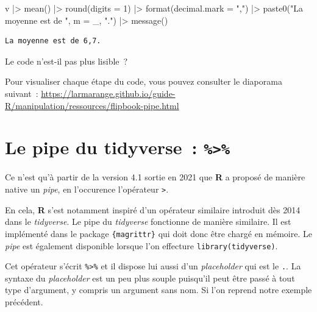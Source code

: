 \documentclass[
  letterpaper,
  DIV=11,
  numbers=noendperiod,
  oneside]{scrreprt}
\newenvironment{Shaded}{\begin{snugshade}}{\end{snugshade}}
\newcommand{\AttributeTok}[1]{\textcolor[rgb]{0.40,0.45,0.13}{#1}}
\newcommand{\DecValTok}[1]{\textcolor[rgb]{0.68,0.00,0.00}{#1}}
\newcommand{\FunctionTok}[1]{\textcolor[rgb]{0.28,0.35,0.67}{#1}}
\newcommand{\NormalTok}[1]{\textcolor[rgb]{0.00,0.23,0.31}{#1}}
\newcommand{\SpecialCharTok}[1]{\textcolor[rgb]{0.37,0.37,0.37}{#1}}
\newcommand{\StringTok}[1]{\textcolor[rgb]{0.13,0.47,0.30}{#1}}
\begin{document}
\begin{Shaded}
\begin{Highlighting}[]
\NormalTok{v }\SpecialCharTok{|\textgreater{}} 
  \FunctionTok{mean}\NormalTok{() }\SpecialCharTok{|\textgreater{}} 
  \FunctionTok{round}\NormalTok{(}\AttributeTok{digits =} \DecValTok{1}\NormalTok{) }\SpecialCharTok{|\textgreater{}} 
  \FunctionTok{format}\NormalTok{(}\AttributeTok{decimal.mark =} \StringTok{","}\NormalTok{) }\SpecialCharTok{|\textgreater{}} 
  \FunctionTok{paste0}\NormalTok{(}\StringTok{"La moyenne est de "}\NormalTok{, }\AttributeTok{m =}\NormalTok{ \_, }\StringTok{"."}\NormalTok{) }\SpecialCharTok{|\textgreater{}} 
  \FunctionTok{message}\NormalTok{()}
\end{Highlighting}
\end{Shaded}

\begin{verbatim}
La moyenne est de 6,7.
\end{verbatim}

Le code n'est-il pas plus lisible~?

Pour visualiser chaque étape du code, vous pouvez consulter le diaporama
suivant~:
\url{https://larmarange.github.io/guide-R/manipulation/ressources/flipbook-pipe.html}

\hypertarget{le-pipe-du-tidyverse}{%
\section{\texorpdfstring{Le pipe du tidyverse~:
\texttt{\%\textgreater{}\%}}{Le pipe du tidyverse~: \%\textgreater\%}}\label{le-pipe-du-tidyverse}}

Ce n'est qu'à partir de la version 4.1 sortie en 2021 que \textbf{R} a
proposé de manière native un \emph{pipe}, en l'occurence l'opérateur
\texttt{\textbar{}\textgreater{}}.

En cela, \textbf{R} s'est notamment inspiré d'un opérateur similaire
introduit dès 2014 dans le \emph{tidyverse}. Le pipe du \emph{tidyverse}
fonctionne de manière similaire. Il est implémenté dans le package
\texttt{\{magrittr\}} qui doit donc être chargé en mémoire. Le
\emph{pipe} est également disponible lorsque l'on effecture
\texttt{library(tidyverse)}.

Cet opérateur s'écrit \texttt{\%\textgreater{}\%} et il dispose lui
aussi d'un \emph{placeholder} qui est le \texttt{.}. La syntaxe du
\emph{placeholder} est un peu plus souple puisqu'il peut être passé à
tout type d'argument, y compris un argument sans nom. Si l'on reprend
notre exemple précédent.
\end{document}
